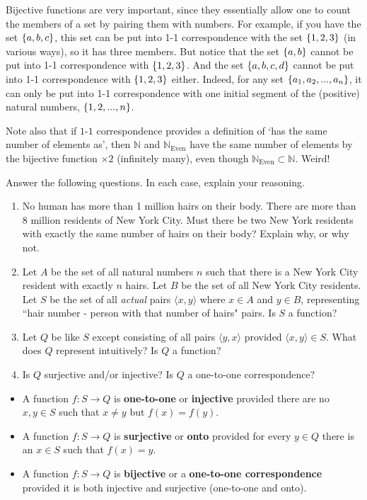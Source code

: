 Bijective functions are very important, since they essentially allow one to count the members of a set by pairing them with numbers. For example, if you have the set $\{a, b, c\}$, this set can be put into 1-1 correspondence with the set $\{1, 2, 3\}$ (in various ways), so it has three members. But notice that the set $\{a, b\}$ cannot be put into 1-1 correspondence with $\{1, 2, 3\}$. And the set $\{a, b, c, d\}$ cannot be put into 1-1 correspondence with $\{1, 2, 3\}$ either. Indeed, for any set $\{a_1, a_2, ..., a_n\}$, it can only be put into 1-1 correspondence with one initial segment of the (positive) natural numbers, $\{1, 2, ..., n\}$. 

Note also that if $1$-$1$ correspondence provides a definition of `has the same number of elements as', then $\mathbb{N}$ and $\mathbb{N}_\text{Even}$ have the same number of elements by the bijective function $\times 2$ (infinitely many), even though $\mathbb{N}_\text{Even} \subset \mathbb{N}$. Weird!

\begin{exc}
	Answer the following questions. In each case, explain your reasoning. 
\begin{enumerate}
	\item No human has more than 1 million hairs on their body. There are more than 8 million residents of New York City. Must there be two New York residents with exactly the same number of hairs on their body? Explain why, or why not. 
	\item Let $A$ be the set of all natural numbers $n$ such that there is a New York City resident with exactly $n$ hairs. Let $B$ be the set of all New York City residents. Let $S$ be the set of all \textit{actual} pairs $\langle x, y \rangle$ where $x \in A$ and $y \in B$, representing ``hair number - person with that number of hairs" pairs. Is $S$ a function?  
	\item Let $Q$ be like $S$ except consisting of all pairs $\langle y, x \rangle$ provided $\langle x, y \rangle \in S$. What does $Q$ represent intuitively? Is $Q$ a function? 
	\item Is $Q$ surjective and/or injective? Is $Q$ a one-to-one correspondence? 
\end{enumerate}
\end{exc}

\begin{defn} \leavevmode
\begin{itemize} 
\item A function $f: S \to Q$ is \textbf{one-to-one} or \textbf{injective} provided there are no $x, y \in S$ such that $x \neq y$ but $f(x)=f(y)$. 
\item A function $f: S \to Q$ is \textbf{surjective} or \textbf{onto} provided for every $y \in Q$ there is an $x \in S$ such that $f(x)=y$. 
\item A function $f: S \to Q$ is \textbf{bijective} or a \textbf{one-to-one correspondence} provided it is both injective and surjective (one-to-one and onto). 
\end{itemize}
\end{defn}

